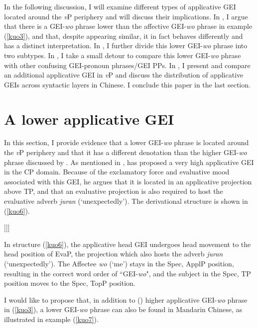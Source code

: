 \documentclass[output=paper,colorlinks,citecolor=brown]{langscibook}
\begin{document}
In the following discussion, I will examine different types of applicative GEI located around the \textit{v}P periphery and will discuss their implications. In , I argue that there is a GEI-\textit{wo} phrase lower than the affective GEI-\textit{wo} phrase in example (\ref{kuo3}), and that, despite appearing similar, it in fact behaves differently and has a distinct interpretation. In , I further divide this lower GEI-\textit{wo} phrase into two subtypes. In , I take a small detour to compare this lower GEI-\textit{wo} phrase with other confusing GEI-pronoun phrases/GEI PPs. In , I present and compare an additional applicative GEI in \textit{v}P and discuss the distribution of applicative GEIs across syntactic layers in Chinese. I conclude this paper in the last section.

\section{A lower applicative GEI}\label{sect2}

In this section, I provide evidence that a lower GEI-\textit{wo} phrase is located around the \textit{v}P periphery and that it has a different denotation than the higher GEI-\textit{wo} phrase discussed by \citet{Tsai2017}. As mentioned in  , \citet{Tsai2017} has proposed a very high applicative GEI in the CP domain. Because of the
exclamatory force and evaluative mood associated with this GEI, he argues that it is located in an applicative projection above TP, and that an evaluative projection is also required to host the evaluative adverb \textit{juran} (`unexpectedly'). The derivational structure is shown in (\ref{kuo6}).

\ea
\label{kuo6}
\glt [\textsubscript{TopP} Zhangsan\textsubscript{i}  [\textsubscript{EvaP}   juran gei\textsubscript{j}  [\textsubscript{ApplP}  wo  t\textsubscript{j}  [\textsubscript{TP}  t\textsubscript{i}  ......]]]]\\  
\z

In structure (\ref{kuo6}), the applicative head GEI undergoes head movement to the head position of EvaP, the projection which also hosts the adverb \textit{juran} (`unexpectedly'). The Affectee \textit{wo} (`me') stays in the Spec, ApplP position, resulting in the correct word order of “GEI-\textit{wo}", and the subject in the Spec, TP position moves to the Spec, TopP position.
 
I would like to propose that, in addition to  (\citeyear{Tsai2017}) higher applicative GEI-\textit{wo} phrase in (\ref{kuo3}), a lower GEI-\textit{wo} phrase can also be found in Mandarin Chinese, as illustrated in example (\ref{kuo7}).
\end{document}
